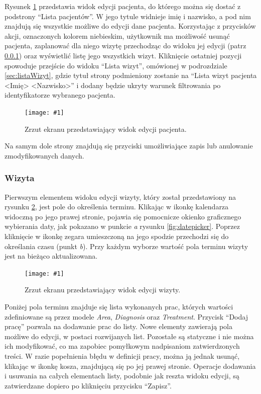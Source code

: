 \documentclass[11pt]{aghdpl}
\newcommand{\fullWidthPicture}[2]{
\begin{figure}[h!]
	\centering
		\texttt{[image: \#1]}
	\caption{#2}
	\label{fig:#1}
\end{figure}
}
\begin{document}
Rysunek \ref{fig:pacjent} przedstawia widok edycji pacjenta, do którego można się dostać z podstrony ``Lista pacjentów''. W jego tytule widnieje imię i nazwisko, a pod nim znajdują się wszystkie możliwe do edycji dane pacjenta. Korzystając z przycisków akcji, oznaczonych kolorem niebieskim, użytkownik ma możliwość usunąć pacjenta, zaplanować dla niego wizytę przechodząc do widoku jej edycji (patrz \ref{sec:wizyta}) oraz wyświetlić listę jego wszystkich wizyt. Kliknięcie ostatniej pozycji spowoduje przejście do widoku ``Lista wizyt'', omówionej w podrozdziale \ref{sec:listaWizyt}, gdzie tytuł strony podmieniony zostanie na ``Lista wizyt pacjenta <Imię> <Nazwisko>'' i dodany będzie ukryty warunek filtrowania po identyfikatorze wybranego pacjenta.

\fullWidthPicture{pacjent}{Zrzut ekranu przedstawiający widok edycji pacjenta.}

Na samym dole strony znajdują się przyciski umożliwiające zapis lub anulowanie zmodyfikowanych danych.


\subsubsection{Wizyta}
\label{sec:wizyta}

Pierwszym elementem widoku edycji wizyty, który został przedstawiony na rysunku \ref{fig:wizyta}, jest pole do określenia terminu. Klikając w ikonkę kalendarza widoczną po jego prawej stronie, pojawia się pomocnicze okienko graficznego wybierania daty, jak pokazano w punkcie \emph{a} rysunku \ref{fig:datepicker}. Poprzez kliknięcie w ikonkę zegara umieszczoną na jego spodzie przechodzi się do określania czasu (punkt \emph{b}). Przy każdym wyborze wartość pola terminu wizyty jest na bieżąco aktualizowana.

\fullWidthPicture{wizyta}{Zrzut ekranu przedstawiający widok edycji wizyty.}

Poniżej pola terminu znajduje się lista wykonanych prac, których wartości zdefiniowane są przez modele \emph{Area}, \emph{Diagnosis} oraz \emph{Treatment}. Przycisk ``Dodaj pracę'' pozwala na dodawanie prac do listy. Nowe elementy zawierają pola możliwe do edycji, w postaci rozwijanych list. Pozostałe są statyczne i nie można ich modyfikować, co ma zapobiec pomyłkowym nadpisaniom zatwierdzonych treści. W razie popełnienia błędu w definicji pracy, można ją jednak usunąć, klikając w ikonkę kosza, znajdującą się po jej prawej stronie. Operacje dodawania i usuwania na całych elementach listy, podobnie jak reszta widoku edycji, są zatwierdzane dopiero po kliknięciu przycisku ``Zapisz''.
\end{document}
